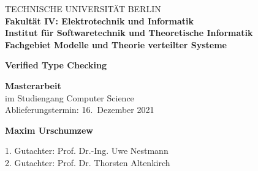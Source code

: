 \begin{titlepage}
%
\vspace*{1em}

\begin{center}%
\large {%
	TECHNISCHE UNIVERSITÄT BERLIN\\ 
  \vspace{0.5cm}
  \textbf{Fakultät IV: Elektrotechnik und Informatik}\\
	\textbf{Institut für Softwaretechnik und Theoretische Informatik}\\
	\textbf{Fachgebiet Modelle und Theorie verteilter Systeme}\\
}
\end{center}
\hfill

%
\vspace*{0.07\textheight}
%
\begin{center}
\huge { \textbf{Verified Type Checking} }\\
\end{center}
%
\vspace*{0.07\textheight}
%
\begin{center}
	\LARGE { \textbf{Masterarbeit} }\\
	\vspace*{1em}
	\Large im Studiengang Computer Science \\
  Ablieferungstermin: 16.\ Dezember 2021
\end{center}
%
\begin{center}
\vspace*{0.5em}
\vspace*{0.9em}
\end{center}
%
\begin{center}
\Large {\textbf{Maxim Urschumzew}} \\
\end{center}
%
\vspace*{0.05\textheight}

\begin{center}
  \Large
  1. Gutachter: Prof. Dr.-Ing. Uwe Nestmann \\
  2. Gutachter: Prof. Dr. Thorsten Altenkirch
\end{center}
%
\end{titlepage}


